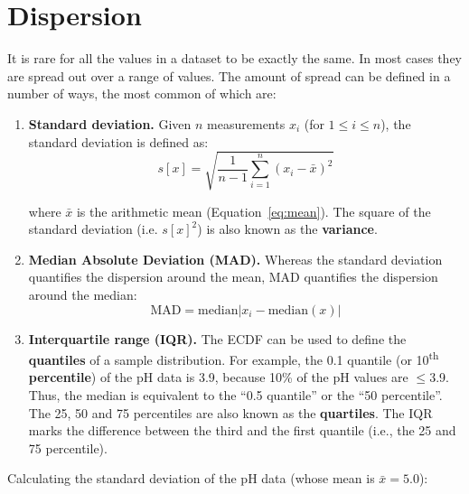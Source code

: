 \section{Dispersion}
\label{sec:dispersion}

It is rare for all the values in a dataset to be exactly the same. In
most cases they are spread out over a range of values. The amount of
spread can be defined in a number of ways, the most common of which
are:

\begin{enumerate}

\item{\bf Standard deviation.} Given $n$ measurements $x_i$ (for $1
  \leq i \leq n$), the standard deviation is defined as:
\begin{equation}
  s[x] = \sqrt{\frac{1}{n-1}\sum\limits_{i=1}^{n}(x_i-\bar{x})^2}
  \label{eq:stdev}
\end{equation}

\noindent where $\bar{x}$ is the arithmetic mean
(Equation~\ref{eq:mean}). The square of the standard deviation
(i.e. $s[x]^2$) is also known as the \textbf{variance}.

\item{\bf Median Absolute Deviation (MAD).} Whereas the standard
  deviation quantifies the dispersion around the mean, MAD quantifies
  the dispersion around the median:
  \begin{equation}
    \mbox{MAD} = \mbox{median}|x_i - \mbox{median}(x)|
    \label{eq:MAD}
  \end{equation}
  
\item{\bf Interquartile range (IQR).} The ECDF can be used to define
  the \textbf{quantiles} of a sample distribution. For example, the
  0.1 quantile (or 10\textsuperscript{th} \textbf{percentile}) of the
  pH data is 3.9, because 10\% of the pH values are $\leq$3.9. Thus,
  the median is equivalent to the ``0.5 quantile'' or the ``50
  percentile''. The 25, 50 and 75 percentiles are also known as the
  \textbf{quartiles}. The IQR marks the difference between the third
  and the first quantile (i.e., the 25 and 75 percentile).
  
\end{enumerate}

Calculating the standard deviation of the pH data (whose mean is
$\bar{x} = 5.0$):

